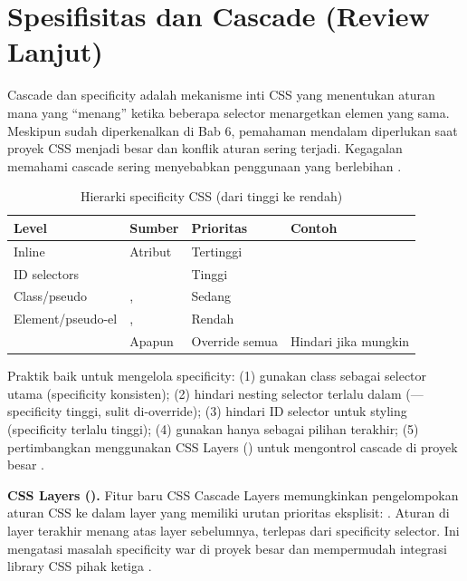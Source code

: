 ﻿\section{Spesifisitas dan Cascade (Review Lanjut)}

Cascade dan specificity adalah mekanisme inti CSS yang menentukan aturan mana yang ``menang'' ketika beberapa selector menargetkan elemen yang sama. Meskipun sudah diperkenalkan di Bab 6, pemahaman mendalam diperlukan saat proyek CSS menjadi besar dan konflik aturan sering terjadi. Kegagalan memahami cascade sering menyebabkan penggunaan  yang berlebihan \cite{mdnCss}.

\begin{table}[H]
\centering
\begin{tabular}{|P{3cm}|P{3.5cm}|P{2cm}|P{3.5cm}|}
\hline
\textbf{Level} & \textbf{Sumber} & \textbf{Prioritas} & \textbf{Contoh} \\
\hline
Inline & Atribut  & Tertinggi &  \\
\hline
ID selectors &  & Tinggi &  \\
\hline
Class/pseudo & ,  & Sedang &  \\
\hline
Element/pseudo-el & ,  & Rendah &  \\
\hline
{} & Apapun & Override semua & Hindari jika mungkin \\
\hline
\end{tabular}
\caption{Hierarki specificity CSS (dari tinggi ke rendah)}
\end{table}

Praktik baik untuk mengelola specificity: (1) gunakan class sebagai selector utama (specificity konsisten); (2) hindari nesting selector terlalu dalam (---specificity tinggi, sulit di-override); (3) hindari ID selector untuk styling (specificity terlalu tinggi); (4) gunakan  hanya sebagai pilihan terakhir; (5) pertimbangkan menggunakan CSS Layers () untuk mengontrol cascade di proyek besar \cite{webdevCss}.

\begin{konsep}
\textbf{CSS Layers ().} Fitur baru CSS Cascade Layers memungkinkan pengelompokan aturan CSS ke dalam layer yang memiliki urutan prioritas eksplisit: . Aturan di layer terakhir menang atas layer sebelumnya, terlepas dari specificity selector. Ini mengatasi masalah specificity war di proyek besar dan mempermudah integrasi library CSS pihak ketiga \cite{w3cCss}.
\end{konsep}

